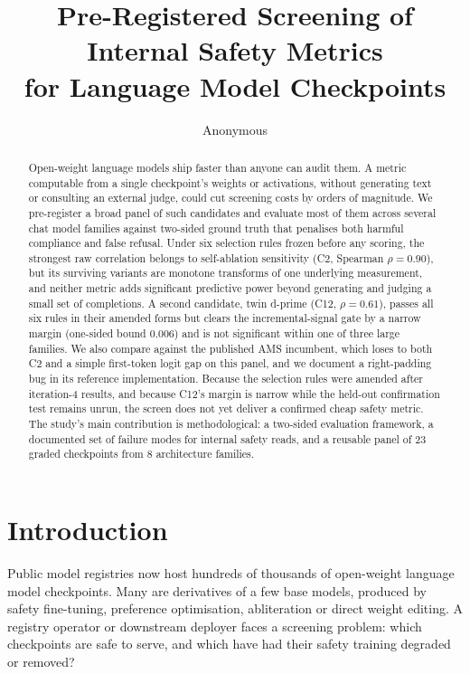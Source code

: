 \documentclass[11pt,letterpaper]{article}
\title{Pre-Registered Screening of Internal Safety Metrics\\for Language Model Checkpoints}
\author{Anonymous}
\date{}
\begin{document}
\maketitle

\begin{abstract}
Open-weight language models ship faster than anyone can audit them.
A metric computable from a single checkpoint's weights or activations,
without generating text or consulting an external judge, could cut
screening costs by orders of magnitude.
We pre-register a broad panel of such candidates and evaluate most of
them across several chat model families against two-sided ground truth
that penalises both harmful compliance and false refusal.
Under six selection rules frozen before any scoring, the strongest raw
correlation belongs to self-ablation sensitivity (C2, Spearman
$\rho = 0.90$), but its surviving variants are monotone transforms of
one underlying measurement, and neither metric adds significant
predictive power beyond generating and judging a small set of
completions.
A second candidate, twin d-prime (C12, $\rho = 0.61$), passes all six
rules in their amended forms but clears the incremental-signal gate by
a narrow margin (one-sided bound $0.006$) and is not significant within
one of three large families.
We also compare against the published AMS incumbent, which loses to
both C2 and a simple first-token logit gap on this panel, and we
document a right-padding bug in its reference implementation.
Because the selection rules were amended after iteration-4 results,
and because C12's margin is narrow while the held-out confirmation
test remains unrun, the screen does not yet deliver a confirmed cheap
safety metric.
The study's main contribution is methodological: a two-sided evaluation
framework, a documented set of failure modes for internal safety reads,
and a reusable panel of 23 graded checkpoints from 8 architecture families.
\end{abstract}

\section{Introduction}

Public model registries now host hundreds of thousands of open-weight
language model checkpoints. Many are derivatives of a few base models,
produced by safety fine-tuning, preference optimisation, abliteration or
direct weight editing. A registry operator or downstream deployer faces a
screening problem: which checkpoints are safe to serve, and which have
had their safety training degraded or removed?
\end{document}
